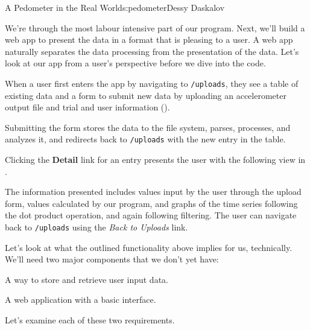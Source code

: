 \begin{aosachapter}{A Pedometer in the Real World}{s:pedometer}{Dessy Daskalov}
\label{adding-a-friendly-interface}

We're through the most labour intensive part of our program. Next, we'll
build a web app to present the data in a format that is pleasing to a
user. A web app naturally separates the data processing from the
presentation of the data. Let's look at our app from a user's
perspective before we dive into the code.

\label{a-user-scenario}

When a user first enters the app by navigating to \texttt{/uploads},
they see a table of existing data and a form to submit new data by
uploading an accelerometer output file and trial and user information
().


Submitting the form stores the data to the file system, parses,
processes, and analyzes it, and redirects back to \texttt{/uploads} with
the new entry in the table.

Clicking the \textbf{Detail} link for an entry presents the user with
the following view in .


The information presented includes values input by the user through the
upload form, values calculated by our program, and graphs of the time
series following the dot product operation, and again following
filtering. The user can navigate back to \texttt{/uploads} using the
\emph{Back to Uploads} link.

Let's look at what the outlined functionality above implies for us,
technically. We'll need two major components that we don't yet have:

\begin{aosaenumerate}
\def\labelenumi{\arabic{enumi}.}

\item
  A way to store and retrieve user input data.
\item
  A web application with a basic interface.
\end{aosaenumerate}

Let's examine each of these two requirements.

\label{storing-and-retrieving-data}


\end{aosachapter}

